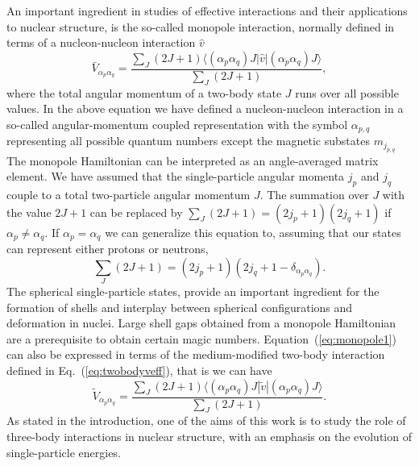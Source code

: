 \documentclass[preprint,12pt,authoryear]{elsarticle}
\begin{document}
An important ingredient in studies of effective interactions and their
applications to nuclear structure, is the so-called monopole
interaction, normally defined in terms of a nucleon-nucleon
interaction $\hat{v}$ \cite{otsuka2001,otsuka2005,otsuka2010b,smirnova2010,nowacki2012,smirnova2012,sorlin2008,poves1981a,poves1981b,zuker2003}
\begin{equation}
\bar{V}_{\alpha_p\alpha_q} = \frac{\sum_{J}(2J+1) \langle (\alpha_p\alpha_q)J | \hat{v} | (\alpha_p\alpha_q)J \rangle }{\sum_{J}(2J+1)},
\label{eq:monopole1}
\end{equation}
where the total angular momentum of a two-body state $J$ runs over all
possible values.  
In the above equation we have defined a nucleon-nucleon interaction in a so-called angular-momentum 
coupled representation with the symbol $\alpha_{p,q}$ representing all possible quantum numbers except the 
magnetic substates $m_{j_{p,q}}$
The monopole Hamiltonian can be interpreted as an angle-averaged matrix element.  
We have assumed that the single-particle angular momenta $j_p$ and $j_q$ couple to a total
two-particle angular momentum $J$.  The summation over $J$ with the value $2J+1$ can be replaced
by $\sum_J(2J+1)=(2j_p+1)(2j_q+1)$ if $\alpha_p\ne \alpha_q$. If $\alpha_p=\alpha_q$ we can generalize this equation to, assuming that 
our states can represent either protons or neutrons,
\begin{equation}
\sum_{J}(2J+1)=(2j_p+1)(2j_q+1-\delta_{\alpha_p\alpha_q}).
\label{eq:jvalue}
\end{equation}
The spherical single-particle states,
provide an important ingredient for the formation of shells and
interplay between spherical configurations and deformation in
nuclei. Large shell gaps obtained from a monopole Hamiltonian are a
prerequisite to obtain certain magic numbers. 
Equation~(\ref{eq:monopole1}) can also be expressed in terms of the
medium-modified two-body interaction defined in
Eq.~(\ref{eq:twobodyveff}), that is we can have 
\begin{equation}
\tilde{V}_{\alpha_p\alpha_q} = \frac{\sum_{J}(2J+1) \langle (\alpha_p\alpha_q)J | \tilde{v} | (\alpha_p\alpha_q)J \rangle }{\sum_{J}(2J+1)}.
\label{eq:monopole2}
\end{equation}
As stated in the introduction, one of the
aims of this work is to study the role of three-body interactions in
nuclear structure, with an emphasis on the evolution of
single-particle energies.
\end{document}

